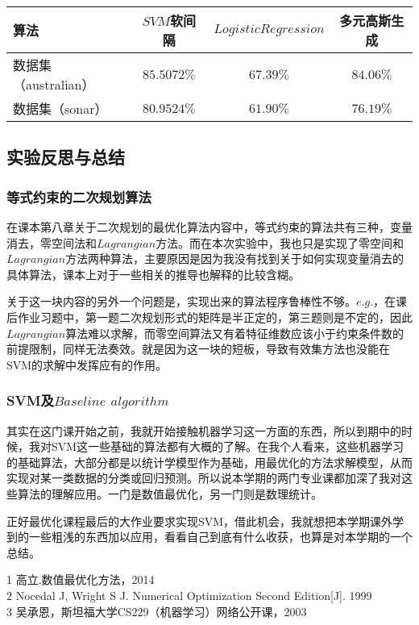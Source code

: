 \documentclass[12pt]{article}
\begin{document}
	       \vspace{15pt}
	       \begin{tabular}{|l|c|c|c|}
	       	\hline
	       	算法 & $SVM$软间隔 & $Logistic Regression$ & 多元高斯生成 \\\hline
	       	数据集（australian） & $85.5072\%$ & $67.39\%$ & $84.06\%$ \\\hline
	       	数据集（sonar） & $80.9524\%$ & $61.90\%$ & $76.19\%$  \\\hline
	       \end{tabular}   
	       
	       \vspace{20pt}
	   \subsection{实验反思与总结}  
	       \vspace{15pt}
	       \subsubsection{等式约束的二次规划算法}
	       在课本第八章关于二次规划的最优化算法内容中，等式约束的算法共有三种，变量消去，零空间法和$Lagrangian$方法。而在本次实验中，我也只是实现了零空间和$Lagrangian$方法两种算法，主要原因是因为我没有找到关于如何实现变量消去的具体算法，课本上对于一些相关的推导也解释的比较含糊。
	       
	       关于这一块内容的另外一个问题是，实现出来的算法程序鲁棒性不够。$e.g.$，在课后作业习题中，第一题二次规划形式的矩阵是半正定的，第三题则是不定的，因此$Lagrangian$算法难以求解，而零空间算法又有着特征维数应该小于约束条件数的前提限制，同样无法奏效。就是因为这一块的短板，导致有效集方法也没能在SVM的求解中发挥应有的作用。
	       
	       \vspace{15pt}
	       
	       \subsubsection{SVM及$Baseline$ $algorithm$}
	       其实在这门课开始之前，我就开始接触机器学习这一方面的东西，所以到期中的时候，我对SVM这一些基础的算法都有大概的了解。在我个人看来，这些机器学习的基础算法，大部分都是以统计学模型作为基础，用最优化的方法求解模型，从而实现对某一类数据的分类或回归预测。所以说本学期的两门专业课都加深了我对这些算法的理解应用。一门是数值最优化，另一门则是数理统计。
	       
	       正好最优化课程最后的大作业要求实现SVM，借此机会，我就想把本学期课外学到的一些粗浅的东西加以应用，看看自己到底有什么收获，也算是对本学期的一个总结。
	         
	\vspace{30pt}
    
	
	1 高立.数值最优化方法，2014\\
	2 Nocedal J, Wright S J. Numerical Optimization Second Edition[J]. 1999 \\
	3 吴承恩，斯坦福大学CS229（机器学习）网络公开课，2003
\end{document}
